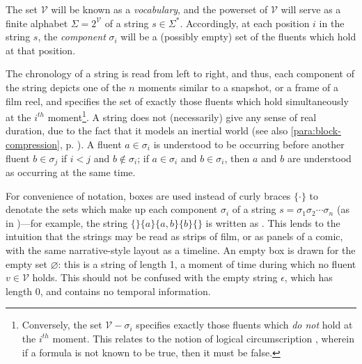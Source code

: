\documentclass[a4paper,12pt,leqno]{article}
\newcommand{\vph}[1]{\vphantom{#1}}
\newcommand{\ebox}[1]{\fbox{$\vph{'(),}#1$}}
\renewcommand{\emptyset}{\varnothing}
\newcommand{\EventString}[1]{%
	\renewcommand*{\do}[1]{\ebox{##1}}%
	\PipeParser{#1}%
}
\newcommand{\selfnote}[1]{{\color{red}[NB\footnote{{\color{red}#1}}]}}
\newcommand{\nb}{\selfnote}
\begin{document}
The set $\mathcal{V}$ will be known as a \textit{vocabulary}, and the powerset of $\mathcal{V}$ will serve as a finite alphabet $\Sigma = 2^{\mathcal{V}}$ of a string $s \in \Sigma^*$. Accordingly, at each position $i$ in the string $s$, the \textit{component} $\sigma_i$ will be a (possibly empty) set of the fluents which hold at that position.

The chronology of a string is read from left to right, and thus, each component of the string depicts one of the $n$ moments similar to a snapshot, or a frame of a film reel, and specifies the set of exactly those fluents which hold simultaneously at the $i^{th}$ moment\footnote{Conversely, the set $\mathcal{V}-\sigma_i$ specifies exactly those fluents which \textit{do not} hold at the $i^{th}$ moment. This relates to the notion of logical circumscription \citep{mccarthy1980circumscription}, wherein if a formula is not known to be true, then it must be false.}. A string does not (necessarily) give any sense of real duration, due to the fact that it models an inertial world  (see also \cref{para:block-compression}, p. \pageref{para:block-compression}). A fluent $a \in \sigma_i$ is understood to be occurring before another fluent $b \in \sigma_j$ if $i < j$ and $b \notin \sigma_i$; if $a \in \sigma_i$ and $b \in \sigma_i$, then $a$ and $b$ are understood as occurring at the same time.%

For convenience of notation, boxes \ebox{\cdot} are used instead of curly braces $\{\cdot\}$ to denotate the sets which make up each component $\sigma_i$ of a string $s = \sigma_1\sigma_2\cdots\sigma_n$ (as in \citet{Fernando2004,fernando2015semantics,fernando2016prior})---for example, the string $\{\}\{a\}\{a,b\}\{b\}\{\}$ is written as \EventString{{}|a|a,b|b|{}}. This lends to the intuition that the strings may be read as strips of film, or as panels of a comic, with the same narrative-style layout as a timeline. An empty box \ebox{} is drawn for the empty set $\emptyset$: this is a string of length 1, a moment of time during which no fluent $v \in \mathcal{V}$ holds. This should not be confused with the empty string $\epsilon$, which has length 0, and contains no temporal information.
\end{document}
